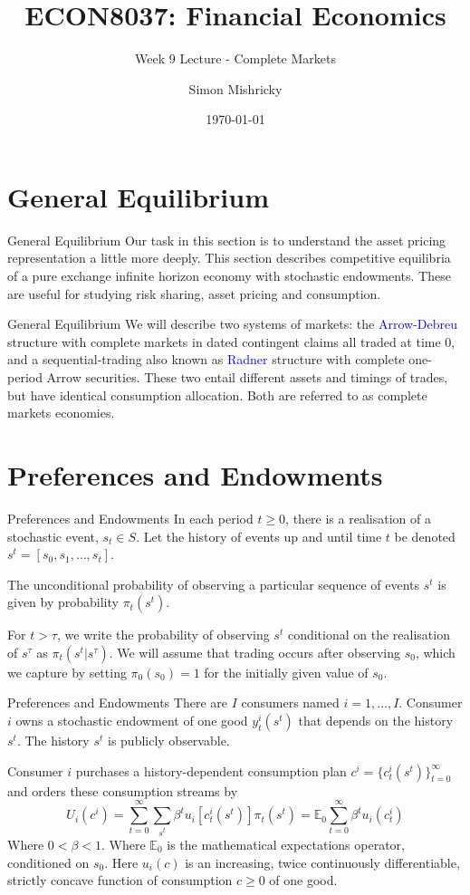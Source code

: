 \documentclass[aspectratio=169,xcolor=dvipsnames]{beamer}
\title{ECON8037: Financial Economics}
\subtitle{\normalsize Week 9 Lecture - Complete Markets}
\author{Simon Mishricky}
\institute{Research School of Economics, Australian National University}
\date{\today}
\begin{document}
\section{General Equilibrium}
\frame{\titlepage}

\begin{frame}{General Equilibrium}
    Our task in this section is to understand the asset pricing representation a little more deeply. This section describes competitive equilibria of a pure exchange infinite horizon economy with stochastic endowments. These are useful for studying risk sharing, asset pricing and consumption.
\end{frame}

\begin{frame}{General Equilibrium}
    We will describe two systems of markets: the \textcolor{blue}{Arrow-Debreu} structure with complete markets in dated contingent claims all traded at time 0, and a sequential-trading also known as \textcolor{blue}{Radner} structure with complete one-period Arrow securities. These two entail different assets and timings of trades, but have identical consumption allocation. Both are referred to as complete markets economies.
\end{frame}

\section{Preferences and Endowments}

\begin{frame}{Preferences and Endowments}
    In each period $t \ge 0$, there is a realisation of a stochastic event, $s_t \in S$. Let the history of events up and until time $t$ be denoted $s^t = [s_0, s_1, \dots, s_t]$.

    The unconditional probability of observing a particular sequence of events $s^t$ is given by probability $\pi_t(s^t)$.

    For $t > \tau$, we write the probability of observing $s^t$ conditional on the realisation of $s^\tau$ as $\pi_t(s^t | s^\tau)$. We will assume that trading occurs after observing $s_0$, which we capture by setting $\pi_0(s_0) = 1$ for the initially given value of $s_0$.
\end{frame}

\begin{frame}{Preferences and Endowments}
    There are $I$ consumers named $i = 1, \dots, I$. Consumer $i$ owns a stochastic endowment of one good $y_t^i(s^t)$ that depends on the history $s^t$. The history $s^t$ is publicly observable.

    Consumer $i$ purchases a history-dependent consumption plan $c^i = \{c_t^i(s^t)\}_{t=0}^\infty$ and orders these consumption streams by
    \[
        U_i(c^i) = \sum_{t=0}^\infty \sum_{s^t} \beta^t u_i[c_t^i(s^t)] \pi_t(s^t) = \mathbb{E}_0 \sum_{t=0}^\infty \beta^t u_i(c_t^i)
    \]
    Where $0 < \beta < 1$. Where $\mathbb{E}_0$ is the mathematical expectations operator, conditioned on $s_0$. Here $u_i(c)$ is an increasing, twice continuously differentiable, strictly concave function of consumption $c \ge 0$ of one good.
\end{frame}
\end{document}
